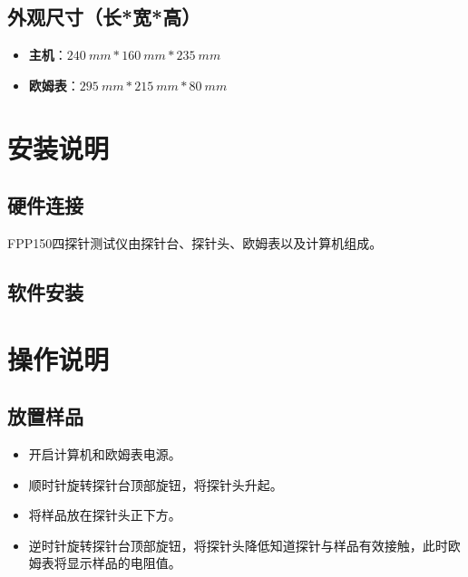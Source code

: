 \documentclass[12pt]{ctexart}
\begin{document}
\subsection{外观尺寸（长*宽*高）}
\begin{itemize}
	\item \textbf{主机}：$240\ mm * 160\ mm * 235\ mm$
	\item \textbf{欧姆表}：$295\ mm * 215\ mm * 80\ mm$
\end{itemize}

\newpage

\section{安装说明}
\subsection{硬件连接}
FPP150四探针测试仪由探针台、探针头、欧姆表以及计算机组成。
\subsection{软件安装}
\newpage

\section{操作说明}
\subsection{放置样品}
\begin{itemize}
	\item 开启计算机和欧姆表电源。
	\item 顺时针旋转探针台顶部旋钮，将探针头升起。
	\item 将样品放在探针头正下方。
	\item 逆时针旋转探针台顶部旋钮，将探针头降低知道探针与样品有效接触，此时欧姆表将显示样品的电阻值。
	
\end{itemize}
\end{document}
